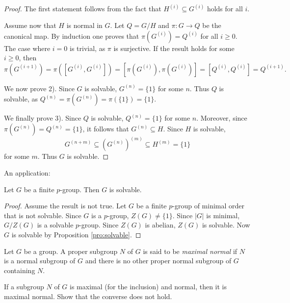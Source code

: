 \begin{proof}
    The first statement follows from the fact that
    $H^{(i)}\subseteq G^{(i)}$ holds for all $i$. 
 
    Assume now that $H$ is normal in $G$. 
    Let $Q=G/H$ and $\pi\colon G\to Q$ be the canonical map.
    By induction one proves that $\pi(G^{(i)})=Q^{(i)}$ for all $i\geq0$.
    The case where $i=0$ is trivial, as $\pi$ is surjective. 
    If the result holds for some $i\geq0$, then
    \[
            \pi(G^{(i+1)})=\pi([G^{(i)},G^{(i)}])=[\pi(G^{(i)}),\pi(G^{(i)})]=[Q^{(i)},Q^{(i)}]=Q^{(i+1)}.
    \]

    We now prove 2). Since $G$ is solvable, $G^{(n)}=\{1\}$ for some $n$. 
    Thus $Q$ is solvable, as $Q^{(n)}=\pi(G^{(n)})=\pi(\{1\})=\{1\}$. 

    We finally prove 3). 
    Since $Q$ is solvable, $Q^{(n)}=\{1\}$ for some $n$.
    Moreover, since $\pi(G^{(n)})=Q^{(n)}=\{1\}$, it follows that
    $G^{(n)}\subseteq H$. Since $H$
    is solvable, 
    \[
        G^{(n+m)}\subseteq (G^{(n)})^{(m)}\subseteq H^{(m)}=\{1\}
    \]
    for some $m$. Thus $G$ is solvable.
\end{proof}

An application:

\begin{proposition}
    Let $G$ be a finite $p$-group. Then $G$ is solvable. 
\end{proposition}

\begin{proof}
    Assume the result is not true. Let $G$ be a finite
    $p$-group of minimal order that is not solvable. Since 
    $G$ is a $p$-group, $Z(G)\ne\{1\}$. Since $|G|$ is minimal, 
    $G/Z(G)$ is a solvable $p$-group. Since $Z(G)$ is abelian, 
    $Z(G)$ is solvable. Now $G$ is solvable 
    by Proposition \ref{pro:solvable}.
\end{proof}

Let $G$ be a group. A proper subgroup $N$ of $G$ is said to be \emph{maximal normal} 
if $N$ is a normal subgroup of $G$ and there is no other proper normal subgroup of $G$ 
containing $N$. 

\begin{exercise}
    If a subgroup $N$ of $G$ is maximal (for the inclusion) and
    normal, then it is maximal normal. Show that the converse does not hold.
\end{exercise}



